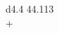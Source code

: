 \documentclass[border = 1mm]{standalone}
\begin{document}
    
\begin{tabular}{d{4.4}}
    44.113 \\
    + \\
    \hline
     \\
    \hline\\
\end{tabular}
\end{document}
